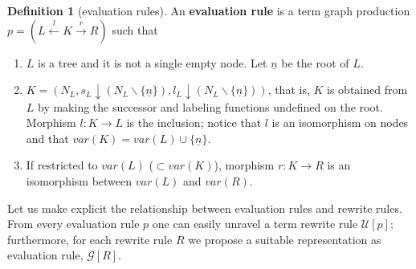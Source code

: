 \documentclass{eptcs}
\theoremstyle{plain}
\theoremstyle{definition}
\newtheorem{definition}[theorem]{Definition}
\newcommand{\varnodes}[1]{var(#1)}
\begin{document}
\begin{definition}[evaluation rules]
\label{de:evaluation rules}
An {\bf evaluation rule\/} is a term graph production 
$p = (L \stackrel{l}{\leftarrow} K
\stackrel{r}{\rightarrow} R)$ 
such that
\begin{enumerate}

\item  $L$ is a tree and it is not a single empty node. Let 
$\underline{n}$ be
the root of $L$.

\item  $K= (N_L, s_L\downarrow(N_L\backslash \{\underline{n}\}), 
l_L\downarrow(N_L\backslash \{\underline{n}\}))$, that is, $K$ is 
obtained
from $L$ by making the successor and labeling functions undefined on 
the root.
Morphism $l: K \rightarrow L$ is the inclusion; notice that $l$ is an 
isomorphism on nodes and that $\varnodes{K} = \varnodes{L}\cup 
\{\underline{n}\}$.

\item  If restricted to $\varnodes{L}$ ($\subset \varnodes{K}$), morphism $r: 
K \rightarrow R$ is an isomorphism between $\varnodes{L}$ 
and $\varnodes{R}$. 
\end{enumerate}
\end{definition}


Let us make explicit the relationship between evaluation rules and 
rewrite rules. From every evaluation rule 
$p$ one can easily unravel a term rewrite rule $\mathcal{U}[p]$; 
furthermore,
for each rewrite rule $R$ we propose a suitable representation as 
evaluation rule, $\mathcal{G}[R]$.
\end{document}
